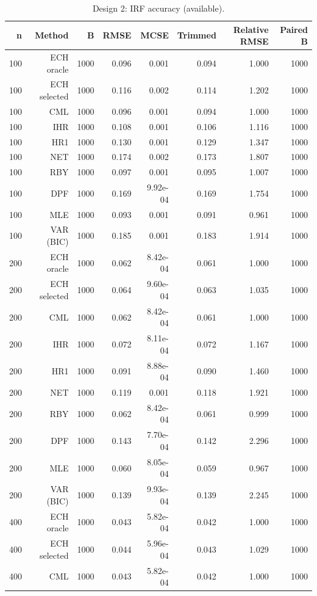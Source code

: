 \begin{table}[p]\centering
\caption{Design 2: IRF accuracy (available).}
\small
\begin{tabular}{rrrrrrrr}\toprule
n & Method & B & RMSE & MCSE & Trimmed & Relative RMSE & Paired B \\\midrule
100 & ECH oracle & 1000 & 0.096 & 0.001 & 0.094 & 1.000 & 1000 \\
100 & ECH selected & 1000 & 0.116 & 0.002 & 0.114 & 1.202 & 1000 \\
100 & CML & 1000 & 0.096 & 0.001 & 0.094 & 1.000 & 1000 \\
100 & IHR & 1000 & 0.108 & 0.001 & 0.106 & 1.116 & 1000 \\
100 & HR1 & 1000 & 0.130 & 0.001 & 0.129 & 1.347 & 1000 \\
100 & NET & 1000 & 0.174 & 0.002 & 0.173 & 1.807 & 1000 \\
100 & RBY & 1000 & 0.097 & 0.001 & 0.095 & 1.007 & 1000 \\
100 & DPF & 1000 & 0.169 & 9.92e-04 & 0.169 & 1.754 & 1000 \\
100 & MLE & 1000 & 0.093 & 0.001 & 0.091 & 0.961 & 1000 \\
100 & VAR (BIC) & 1000 & 0.185 & 0.001 & 0.183 & 1.914 & 1000 \\
200 & ECH oracle & 1000 & 0.062 & 8.42e-04 & 0.061 & 1.000 & 1000 \\
200 & ECH selected & 1000 & 0.064 & 9.60e-04 & 0.063 & 1.035 & 1000 \\
200 & CML & 1000 & 0.062 & 8.42e-04 & 0.061 & 1.000 & 1000 \\
200 & IHR & 1000 & 0.072 & 8.11e-04 & 0.072 & 1.167 & 1000 \\
200 & HR1 & 1000 & 0.091 & 8.88e-04 & 0.090 & 1.460 & 1000 \\
200 & NET & 1000 & 0.119 & 0.001 & 0.118 & 1.921 & 1000 \\
200 & RBY & 1000 & 0.062 & 8.42e-04 & 0.061 & 0.999 & 1000 \\
200 & DPF & 1000 & 0.143 & 7.70e-04 & 0.142 & 2.296 & 1000 \\
200 & MLE & 1000 & 0.060 & 8.05e-04 & 0.059 & 0.967 & 1000 \\
200 & VAR (BIC) & 1000 & 0.139 & 9.93e-04 & 0.139 & 2.245 & 1000 \\
400 & ECH oracle & 1000 & 0.043 & 5.82e-04 & 0.042 & 1.000 & 1000 \\
400 & ECH selected & 1000 & 0.044 & 5.96e-04 & 0.043 & 1.029 & 1000 \\
400 & CML & 1000 & 0.043 & 5.82e-04 & 0.042 & 1.000 & 1000 \\

\end{tabular}
\end{table}
